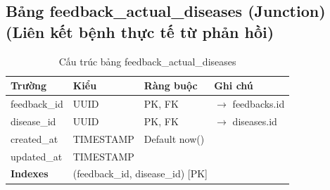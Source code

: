\documentclass[12pt,a4paper]{article}
\begin{document}
\subsection{Bảng feedback\_actual\_diseases (Junction) (Liên kết bệnh thực tế từ phản hồi)}
\begin{longtable}{|l|l|l|p{5.5cm}|}
    \caption{Cấu trúc bảng feedback\_actual\_diseases}                                                                         \\
    \hline
    \rowcolor{headerblue}
    \textbf{Trường}  & \textbf{Kiểu}                                         & \textbf{Ràng buộc} & \textbf{Ghi chú}           \\
    \hline
    feedback\_id     & UUID                                                  & PK, FK             & $\rightarrow$ feedbacks.id \\
    \hline
    disease\_id      & UUID                                                  & PK, FK             & $\rightarrow$ diseases.id  \\
    \hline
    created\_at      & TIMESTAMP                                             & Default now()      &                            \\
    \hline
    updated\_at      & TIMESTAMP                                             &                    &                            \\
    \hline
    \rowcolor{headerblue}
    \textbf{Indexes} & \multicolumn{3}{l|}{(feedback\_id, disease\_id) [PK]}                                                   \\
    \hline
\end{longtable}
\end{document}
